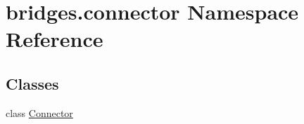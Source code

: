 \hypertarget{namespacebridges_1_1connector}{}\section{bridges.\+connector Namespace Reference}
\label{namespacebridges_1_1connector}
\subsection*{Classes}
\begin{DoxyCompactItemize}
\item 
class \mbox{\hyperlink{classbridges_1_1connector_1_1_connector}{Connector}}
\end{DoxyCompactItemize}
